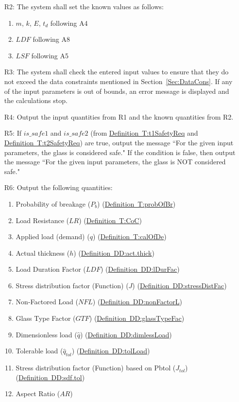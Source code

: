\documentclass[12pt]{article}
\begin{document}
\begin{itemize}
\item[R2:]The system shall set the known values as follows: 
          \begin{enumerate}
          \item{$m$, $k$, $E$, $t_{d}$ following A4}
          \item{$LDF$ following A8}
          \item{$LSF$ following A5}
          \end{enumerate}
\item[R3:]The system shall check the entered input values to ensure that they do not exceed the data constraints mentioned in Section~\ref{Sec:DataCons}. If any of the input parameters is out of bounds, an error message is displayed and the calculations stop.
\item[R4:]Output the input quantities from R1 and the known quantities from R2.
\item[R5:]If $is\_safe1$ and $is\_safe2$ (from \hyperref[T:t1SafetyReq]{Definition~T:t1SafetyReq} and \hyperref[T:t2SafetyReq]{Definition~T:t2SafetyReq}) are true, output the message ``For the given input parameters, the glass is considered safe." If the condition is false, then output the message ``For the given input parameters, the glass is NOT considered safe."
\item[R6:]Output the following quantities:
          \begin{enumerate}
          \item{Probability of breakage ($P_{b}$) (\hyperref[T:probOfBr]{Definition~T:probOfBr})}
          \item{Load Resistance ($LR$) (\hyperref[T:CoC]{Definition~T:CoC})}
          \item{Applied load (demand) ($q$) (\hyperref[T:calOfDe]{Definition~T:calOfDe})}
          \item{Actual thickness ($h$) (\hyperref[DD:act.thick]{Definition~DD:act.thick})}
          \item{Load Duration Factor ($LDF$) (\hyperref[DD:lDurFac]{Definition~DD:lDurFac})}
          \item{Stress distribution factor (Function) ($J$) (\hyperref[DD:stressDistFac]{Definition~DD:stressDistFac})}
          \item{Non-Factored Load ($NFL$) (\hyperref[DD:nonFactorL]{Definition~DD:nonFactorL})}
          \item{Glass Type Factor ($GTF$) (\hyperref[DD:glassTypeFac]{Definition~DD:glassTypeFac})}
          \item{Dimensionless load ($\hat{q}$) (\hyperref[DD:dimlessLoad]{Definition~DD:dimlessLoad})}
          \item{Tolerable load ($\hat{q}_{tol}$) (\hyperref[DD:tolLoad]{Definition~DD:tolLoad})}
          \item{Stress distribution factor (Function) based on Pbtol ($J_{tol}$) (\hyperref[DD:sdf.tol]{Definition~DD:sdf.tol})}
          \item{Aspect Ratio ($AR$)}
          \end{enumerate}
\end{itemize}
\end{document}
